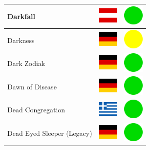 \documentclass[12pt, a4paper, twoside]{report}
\begin{document}
\begin{center}
\begin{longtable}{|p{5cm}|p{2cm}|p{2cm}|}
 Darkfall                                                   & \includegraphics[width=1cm]{4x3/at} &   \includegraphics[width=1cm]{likes/y} \\ \hline
 Darkness                                                   & \includegraphics[width=1cm]{4x3/de} &   \includegraphics[width=1cm]{likes/m} \\ \hline
 Dark Zodiak                                                & \includegraphics[width=1cm]{4x3/de} &   \includegraphics[width=1cm]{likes/y} \\ \hline
 Dawn of Disease                                            & \includegraphics[width=1cm]{4x3/de} &   \includegraphics[width=1cm]{likes/y} \\ \hline
 Dead Congregation                                          & \includegraphics[width=1cm]{4x3/gr} &   \includegraphics[width=1cm]{likes/y} \\ \hline
 Dead Eyed Sleeper (Legacy)                                 & \includegraphics[width=1cm]{4x3/de} &   \includegraphics[width=1cm]{likes/y} \\ \hline

\end{longtable}
\end{center}
\end{document}
